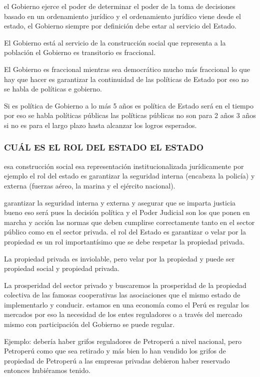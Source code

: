 \documentclass[
  a4paper,
]{article}
\begin{document}
el Gobierno ejerce el poder de determinar el poder de la toma de
decisiones basado en un ordenamiento jurídico y el ordenamiento jurídico
viene desde el estado, el Gobierno siempre por definición debe estar al
servicio del Estado.

El Gobierno está al servicio de la construcción social que representa a
la población el Gobierno es transitorio es fraccional.

El Gobierno es fraccional mientras sea democrático mucho más fraccional
lo que hay que hacer es garantizar la continuidad de las políticas de
Estado por eso no se habla de políticas e gobierno.

Si es política de Gobierno a lo más 5 años es política de Estado será en
el tiempo por eso se habla políticas públicas las políticas públicas no
son para 2 años 3 años si no es para el largo plazo hasta alcanzar los
logros esperados.

\hypertarget{cuuxe1l-es-el-rol-del-estado-el-estado}{%
\subsubsection{CUÁL ES EL ROL DEL ESTADO EL
ESTADO}\label{cuuxe1l-es-el-rol-del-estado-el-estado}}

esa construcción social esa representación institucionalizada
jurídicamente por ejemplo el rol del estado es garantizar la seguridad
interna (encabeza la policía) y externa (fuerzas aéreo, la marina y el
ejército nacional).

garantizar la seguridad interna y externa y asegurar que se imparta
justicia bueno eso será pues la decisión política y el Poder Judicial
son los que ponen en marcha y acción las normas que deben cumplirse
correctamente tanto en el sector público como en el sector privada. el
rol del Estado es garantizar o velar por la propiedad es un rol
importantísimo que se debe respetar la propiedad privada.

La propiedad privada es inviolable, pero velar por la propiedad y puede
ser propiedad social y propiedad privada.

La prosperidad del sector privado y buscaremos la prosperidad de la
propiedad colectiva de las famosas cooperativas las asociaciones que el
mismo estado de implementarlo y conducir. estamos en una economía como
el Perú es regular los mercados por eso la necesidad de los entes
reguladores o a través del mercado mismo con participación del Gobierno
se puede regular.

Ejemplo: debería haber grifos reguladores de Petroperú a nivel nacional,
pero Petroperú como que sea retirado y más bien lo han vendido los
grifos de propiedad de Petroperú a las empresas privadas debieron haber
reservado entonces hubiéramos tenido.
\end{document}
